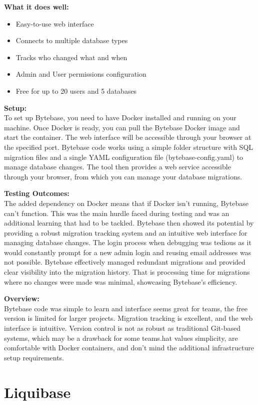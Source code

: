 \documentclass[11pt,a4paper]{article}
\begin{document}
\textbf{What it does well:}
\begin{itemize}
    \item Easy-to-use web interface
    \item Connects to multiple database types
    \item Tracks who changed what and when
    \item Admin and User permissions configuration
    \item Free for up to 20 users and 5 databases
\end{itemize}

\textbf{Setup:}\\
To set up Bytebase, you need to have Docker installed and running on your machine.
Once Docker is ready, you can pull the Bytebase Docker image and start the container.
The web interface will be accessible through your browser at the specified port.
Bytebase code works using a simple folder structure with SQL migration files and a single YAML configuration file (bytebase-config.yaml) to manage database changes.
The tool then provides a web service accessible through your browser, from which you can manage your database migrations.

\textbf{Testing Outcomes:}\\
The added dependency on Docker means that if Docker isn't running, Bytebase can't function.
This was the main hurdle faced during testing and was an additional learning that had to be tackled.
Bytebase then showed its potential by providing a robust migration tracking system and an intuitive web interface for managing database changes.
The login process when debugging was tedious as it would constantly prompt for a new admin login and reusing email addresses was not possible.
Bytebase effectively managed redundant migrations and provided clear visibility into the migration history.
That is processing time for migrations where no changes were made was minimal, showcasing Bytebase's efficiency.

\textbf{Overview:}\\
Bytebase code was simple to learn and interface seems great for teams, the free version is limited for larger projects.
Migration tracking is excellent, and the web interface is intuitive.
Version control is not as robust as traditional Git-based systems, which may be a drawback for some teams.hat values simplicity, are comfortable with Docker containers, and don't mind the additional infrastructure setup requirements.

\section{Liquibase}
\end{document}
